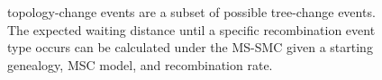 \documentclass[11pt]{article}
\begin{document}
\begin{figure}[t]
{		topology-change events are a subset of possible tree-change events. The expected waiting
		distance until a specific recombination event type occurs can be calculated under 
		the MS-SMC given a starting genealogy, MSC model, and recombination rate.
}
\label{fig:fig2}
\end{figure}
\end{document}
